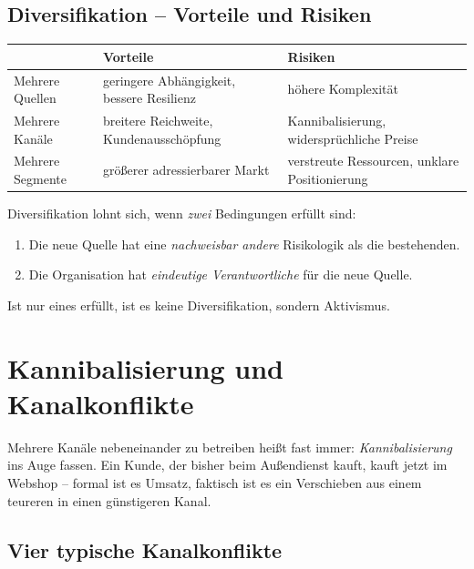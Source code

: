 \documentclass[11pt,a4paper,oneside]{article}
\begin{document}
\subsection{Diversifikation -- Vorteile und Risiken}

\begin{tabularx}{\linewidth}{@{}lXX@{}}
\toprule
& \textbf{Vorteile} & \textbf{Risiken} \\
\midrule
Mehrere Quellen & geringere Abhängigkeit, bessere Resilienz & höhere Komplexität \\
Mehrere Kanäle & breitere Reichweite, Kundenausschöpfung & Kannibalisierung, widersprüchliche Preise \\
Mehrere Segmente & größerer adressierbarer Markt & verstreute Ressourcen, unklare Positionierung \\
\bottomrule
\end{tabularx}

\begin{merkbox}
Diversifikation lohnt sich, wenn \emph{zwei} Bedingungen erfüllt sind:
\begin{enumerate}
  \item Die neue Quelle hat eine \emph{nachweisbar andere} Risikologik als die bestehenden.
  \item Die Organisation hat \emph{eindeutige Verantwortliche} für die neue Quelle.
\end{enumerate}
Ist nur eines erfüllt, ist es keine Diversifikation, sondern Aktivismus.
\end{merkbox}

\section{Kannibalisierung und Kanalkonflikte}

Mehrere Kanäle nebeneinander zu betreiben heißt fast immer: \emph{Kannibalisierung} ins Auge fassen. Ein Kunde, der bisher beim Außendienst kauft, kauft jetzt im Webshop -- formal ist es Umsatz, faktisch ist es ein Verschieben aus einem teureren in einen günstigeren Kanal.

\subsection{Vier typische Kanalkonflikte}
\end{document}
